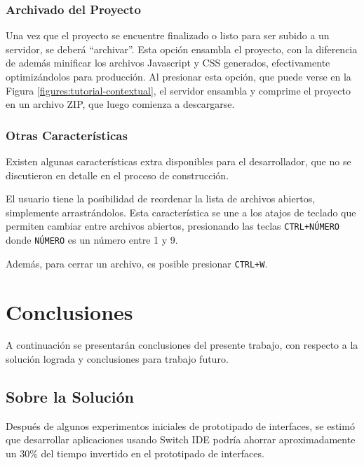 \documentclass[12pt,spanish,letter]{report}
\begin{document}
\subsection{Archivado del Proyecto}

Una vez que el proyecto se encuentre finalizado o listo para ser subido
a un servidor, se deberá ``archivar''. Esta opción ensambla el proyecto,
con la diferencia de además minificar los archivos Javascript y CSS
generados, efectivamente optimizándolos para producción. Al presionar
esta opción, que puede verse en la Figura
\ref{figures:tutorial-contextual}, el servidor ensambla y comprime el
proyecto en un archivo ZIP, que luego comienza a descargarse.

\subsection{Otras Características}

Existen algunas características extra disponibles para el desarrollador,
que no se discutieron en detalle en el proceso de construcción.

El usuario tiene la posibilidad de reordenar la lista de archivos
abiertos, simplemente arrastrándolos. Esta característica se une a los
atajos de teclado que permiten cambiar entre archivos abiertos,
presionando las teclas \texttt{CTRL+NÚMERO} donde \texttt{NÚMERO} es un
número entre 1 y 9.

Además, para cerrar un archivo, es posible presionar \texttt{CTRL+W}.

\clearpage
\newpage

\chapter{Conclusiones}

\label{section:conclusion}

A continuación se presentarán conclusiones del presente trabajo, con
respecto a la solución lograda y conclusiones para trabajo futuro.

\section{Sobre la Solución}

Después de algunos experimentos iniciales de prototipado de interfaces,
se estimó que desarrollar aplicaciones usando Switch IDE podría ahorrar
aproximadamente un 30\% del tiempo invertido en el prototipado de
interfaces.
\end{document}

